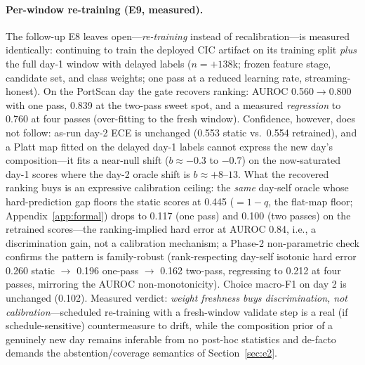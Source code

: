 \documentclass[sigconf,anonymous=false]{acmart}
\begin{document}
\paragraph{Per-window re-training (E9, measured).} The follow-up E8 leaves open---\emph{re-training} instead of recalibration---is measured identically: continuing to train the deployed CIC artifact on its training split \emph{plus} the full day-1 window with delayed labels ($n{=}{+}138$k; frozen feature stage, candidate set, and class weights; one pass at a reduced learning rate, streaming-honest). On the PortScan day the gate recovers ranking: AUROC 0.560$\to$0.800 with one pass, 0.839 at the two-pass sweet spot, and a measured \emph{regression} to 0.760 at four passes (over-fitting to the fresh window). Confidence, however, does not follow: as-run day-2 ECE is unchanged (0.553 static vs.\ 0.554 retrained), and a Platt map fitted on the delayed day-1 labels cannot express the new day's composition---it fits a near-null shift ($b\approx-0.3$ to $-0.7$) on the now-saturated day-1 scores where the day-2 oracle shift is $b\approx{+}8$--$13$. What the recovered ranking buys is an expressive calibration ceiling: the \emph{same} day-self oracle whose hard-prediction gap floors the static scores at 0.445 ($=1{-}q$, the flat-map floor; Appendix~\ref{app:formal}) drops to 0.117 (one pass) and 0.100 (two passes) on the retrained scores---the ranking-implied hard error at AUROC 0.84, i.e., a discrimination gain, not a calibration mechanism; a Phase-2 non-parametric check confirms the pattern is family-robust (rank-respecting day-self isotonic hard error 0.260 static $\to$ 0.196 one-pass $\to$ 0.162 two-pass, regressing to 0.212 at four passes, mirroring the AUROC non-monotonicity). Choice macro-F1 on day 2 is unchanged (0.102). Measured verdict: \emph{weight freshness buys discrimination, not calibration}---scheduled re-training with a fresh-window validate step is a real (if schedule-sensitive) countermeasure to drift, while the composition prior of a genuinely new day remains inferable from no post-hoc statistics and de-facto demands the abstention/coverage semantics of Section~\ref{sec:e2}.
\end{document}
